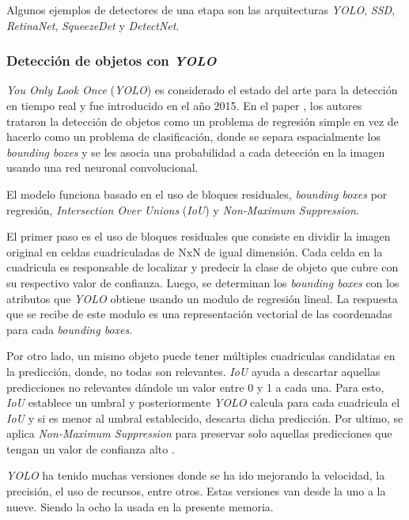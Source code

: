 Algunos ejemplos de detectores de una etapa son las arquitecturas \textit{YOLO}, \textit{SSD}, \textit{RetinaNet}, \textit{SqueezeDet} y \textit{DetectNet}. 

\subsubsection{Detección de objetos con \textit{YOLO}}

\textit{You Only Look Once} (\textit{YOLO}) es considerado el estado del arte para la detección en tiempo real y fue introducido en el año 2015. En el paper \cite{ARTICLE:13}, los autores trataron la detección de objetos como un problema de regresión simple en vez de hacerlo como un problema de clasificación, donde se separa espacialmente los \textit{bounding boxes} y se les asocia una probabilidad a cada detección en la imagen usando una red neuronal convolucional.

El modelo funciona basado en el uso de bloques residuales, \textit{bounding boxes} por regresión, \textit{Intersection Over Unions} (\textit{IoU}) y \textit{Non-Maximum Suppression}.

El primer paso es el uso de bloques residuales que consiste en dividir la imagen original en celdas cuadriculadas de NxN de igual dimensión. Cada celda en la cuadricula es responsable de localizar y predecir la clase de objeto que cubre con su respectivo valor de confianza. Luego, se determinan los \textit{bounding boxes} con los atributos que \textit{YOLO} obtiene usando un modulo de regresión lineal. La respuesta que se recibe de este modulo es una representación vectorial de las coordenadas para cada \textit{bounding boxes}.

Por otro lado, un mismo objeto puede tener múltiples cuadriculas candidatas en la predicción, donde, no todas son relevantes. \textit{IoU} ayuda a descartar aquellas predicciones no relevantes dándole un valor entre 0 y 1 a cada una. Para esto, \textit{IoU} establece un umbral y posteriormente \textit{YOLO} calcula para cada cuadricula el \textit{IoU} y si es menor al umbral establecido, descarta dicha predicción. Por ultimo, se aplica \textit{Non-Maximum Suppression} para preservar solo aquellas predicciones que tengan un valor de confianza alto \cite{WEBSITE:7}.

\textit{YOLO} ha tenido muchas versiones donde se ha ido mejorando la velocidad, la precisión, el uso de recursos, entre otros. Estas versiones van desde la uno a la nueve. Siendo la ocho la usada en la presente memoria.

